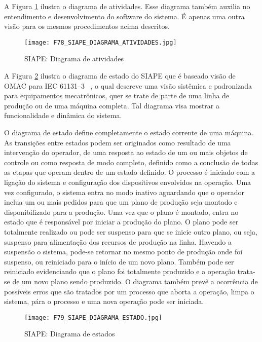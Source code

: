 A Figura \ref{F78} ilustra o diagrama de atividades. Esse diagrama também auxilia no entendimento e desenvolvimento do software do sistema. É apenas uma outra visão para os mesmos procedimentos acima descritos. 
 		 	 
\begin{figure}[!h]
	\centering
	\texttt{[image: F78\_SIAPE\_DIAGRAMA\_ATIVIDADES.jpg]} 
	\caption{SIAPE: Diagrama de atividades}
	\label{F78}
\end{figure}
 		 	 	 
 		 	 	
 		 	 	 
 A Figura \ref{F79} ilustra o diagrama de estado do SIAPE que é baseado visão de OMAC para IEC 61131--3~ \cite{OMAC2006}, o qual descreve uma visão sistêmica e padronizada para equipamentos mecatrônicos, quer se trate de parte de uma linha de produção ou de uma máquina completa. Tal diagrama visa mostrar a funcionalidade e dinâmica do sistema.
 
 O diagrama de estado define completamente o estado corrente de uma máquina. As transições entre estados podem ser originados como resultado de uma intervenção  do operador, de uma resposta ao estado de um ou mais objetos de controle ou como resposta de modo completo, definido como a conclusão de todas as etapas que operam dentro de um estado definido. O processo é iniciado com a ligação do sistema e configuração dos dispositivos envolvidos na operação. Uma vez configurado, o sistema entra no modo inativo aguardando que o operador inclua um ou mais pedidos para que um plano de produção seja montado e disponibilizado para a produção. Uma vez que o plano é montado, entra no estado que é responsável por iniciar a produção do plano. O plano pode ser totalmente realizado ou pode ser suspenso para que se inicie outro plano, ou seja, suspenso para alimentação dos recursos de produção na linha. Havendo a suspensão o sistema, pode-se retornar no mesmo ponto de produção onde foi suspenso, ou reiniciado para o início de um novo plano. Também pode ser reiniciado evidenciando que o plano foi totalmente produzido e a operação trata-se de um novo plano sendo produzido. O diagrama também prevê a ocorrência de possíveis erros que são tratados por um processo que aborta a operação, limpa o sistema, pára o processo e uma nova operação pode ser iniciada.    
%
	 
\begin{landscape}
	\begin{figure}
		\centering
		\texttt{[image: F79\_SIAPE\_DIAGRAMA\_ESTADO.jpg]} 
		\caption{SIAPE: Diagrama de estados}
		\label{F79}
	\end{figure}
\end{landscape}
 		 
